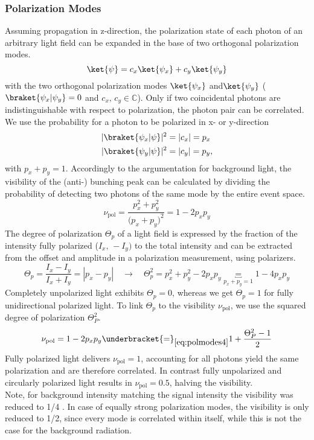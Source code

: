 \subsubsection{Polarization Modes}
Assuming propagation in z-direction, the polarization state of each photon of an arbitrary light field can be expanded in the base of two orthogonal polarization modes.
\begin{equation}\label{eq:polmodes1}
	\ket{\psi}=c_x\ket{\psi_x}+c_y\ket{\psi_y}
\end{equation}
with the two orthogonal polarization modes $\ket{\psi_x}$ and$\ket{\psi_y}$ ($\braket{\psi_x|\psi_y}=0$ and $c_x,\, c_y\in \mathbb{C}$). Only if two coincidental photons are indistinguishable with respect to polarization, the photon pair can be correlated. We use the probability for a photon to be polarized in x- or y-direction
\begin{align}\label{eq:polmodes2}
	|\braket{\psi_x|\psi}|^2&=|c_x|=p_x\\
	|\braket{\psi_y|\psi}|^2&=|c_y|=p_y\nonumber,
\end{align}
with $p_x+p_y=1$.
Accordingly to the argumentation for background light, the visibility of the (anti-) bunching peak can be calculated by dividing the probability of detecting two photons of the same mode by the entire event space.
\begin{equation}\label{eq:polmodes3}
	\nu_\mathrm{pol}=\dfrac{p_x^2+p_y^2}{\big(p_x+p_y\big)^2}=1-2p_xp_y
\end{equation}
The degree of polarization $\Theta_p$ of a light field is expressed by the fraction of the intensity fully polarized ($I_x,\,-I_y)$ to the total intensity and can be extracted from the offset and amplitude in a polarization measurement, using polarizers.
\begin{equation}\label{eq:polmodes4}
	\Theta_p=\dfrac{I_x-I_y}{I_x+I_y}=|p_x-p_y|\quad\rightarrow\quad\Theta_p^2=p_x^2+p_y^2-2p_xp_y\underbracket{=}_{p_x+p_y=1}1-4p_xp_y
\end{equation}
Completely unpolarized light exhibits $\Theta_p=0$, whereas we get $\Theta_p=1$ for fully unidirectional polarized light.
To link $\Theta_p$ to the visibility $\nu_\mathrm{pol}$, we use the squared degree of polarization $\Theta_P^2$.
\begin{equation}\label{eq:polmodes5}
	\nu_\mathrm{pol}=1-2p_xp_y\underbracket{=}_{\mathrm{\cref{eq:polmodes4}}}1+\dfrac{\Theta_P^2-1}{2}
\end{equation}
Fully polarized light delivers $\nu_\mathrm{pol}=1$, accounting for all photons yield the same polarization and are therefore correlated. In contrast fully unpolarized and circularly polarized light results in $\nu_\mathrm{pol}=0.5$, halving the visibility.\\
Note, for background intensity matching the signal intensity the visibility was reduced to 1/4 . In case of equally strong polarization modes, the visibility is only reduced to 1/2, since every mode is correlated within itself, while this is not the case for the background radiation.


